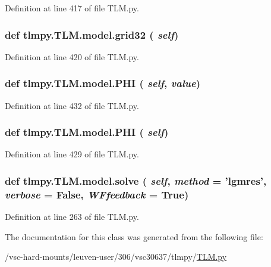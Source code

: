 Definition at line 417 of file TLM.py.\hypertarget{classtlmpy_1_1TLM_1_1model_ad9f202727f76eb19509af52fdb41e758}{
\subsubsection[{grid32}]{\setlength{\rightskip}{0pt plus 5cm}def tlmpy.TLM.model.grid32 ( {\em self})}}
\label{classtlmpy_1_1TLM_1_1model_ad9f202727f76eb19509af52fdb41e758}


Definition at line 420 of file TLM.py.\hypertarget{classtlmpy_1_1TLM_1_1model_a780e6e0262490c10190cc948bf195e36}{
\subsubsection[{PHI}]{\setlength{\rightskip}{0pt plus 5cm}def tlmpy.TLM.model.PHI ( {\em self}, \/   {\em value})}}
\label{classtlmpy_1_1TLM_1_1model_a780e6e0262490c10190cc948bf195e36}


Definition at line 432 of file TLM.py.\hypertarget{classtlmpy_1_1TLM_1_1model_a780e6e0262490c10190cc948bf195e36}{
\subsubsection[{PHI}]{\setlength{\rightskip}{0pt plus 5cm}def tlmpy.TLM.model.PHI ( {\em self})}}
\label{classtlmpy_1_1TLM_1_1model_a780e6e0262490c10190cc948bf195e36}


Definition at line 429 of file TLM.py.\hypertarget{classtlmpy_1_1TLM_1_1model_af591ab0f0283c7f8064e4e1a89b42dfb}{
\subsubsection[{solve}]{\setlength{\rightskip}{0pt plus 5cm}def tlmpy.TLM.model.solve ( {\em self}, \/   {\em method} = {\ttfamily 'lgmres'}, \/   {\em verbose} = {\ttfamily False}, \/   {\em WFfeedback} = {\ttfamily True})}}
\label{classtlmpy_1_1TLM_1_1model_af591ab0f0283c7f8064e4e1a89b42dfb}


Definition at line 263 of file TLM.py.

The documentation for this class was generated from the following file:\begin{DoxyCompactItemize}
\item 
/vsc-\/hard-\/mounts/leuven-\/user/306/vsc30637/tlmpy/\hyperlink{TLM_8py}{TLM.py}\end{DoxyCompactItemize}
